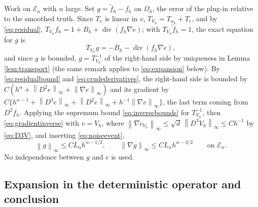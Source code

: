 \documentclass[12pt]{article}
\numberwithin{equation}{section}
\newcommand{\norm}[1]{\left\|#1\right\|}
\newcommand{\diver}{\operatorname{div}}
\begin{document}
Work on $\mathcal E_n$ with $n$ large. Set $g=\widetilde f_h-f_h$ on
$\Omega_h$, the error of the plug-in relative to the smoothed truth.
Since $T_v$ is linear in $v$, $T_{V_h}=T_{u_h}+T_e$, and by
\eqref{eq:residual},
$T_{V_h}f_h=1+B_h+\diver(f_h\nabla e)$; with $T_{V_h}\widetilde f_h=1$,
the exact equation for $g$ is
\begin{equation}\label{eq:gequation}
 T_{V_h}g=-B_h-\diver(f_h\nabla e),
\end{equation}
and since $g$ is bounded, $g=T_{V_h}^{-1}$ of the right-hand side by
uniqueness in Lemma \ref{lem:transport} (the same remark applies to
\eqref{eq:expansion} below). By \eqref{eq:residualbound} and
\eqref{eq:crudederivatives}, the right-hand side is bounded by
$C(h^\alpha+\norm{D^2e}_\infty+\norm{\nabla e}_\infty)$ and its
gradient by
$C\{h^{\alpha-1}+\norm{D^3e}_\infty+\norm{D^2e}_\infty
+h^{-1}\norm{\nabla e}_\infty\}$, the last term coming from $D^2f_h$.
Applying the supremum bound \eqref{eq:inversebounds} for
$T_{V_h}^{-1}$, then \eqref{eq:gradientinverse} with $v=V_h$, where
$\norm{\nabla c_{V_h}}_\infty\le\sqrt d\,\norm{D^3V_h}_\infty\le Ch^{-1}$
by \eqref{eq:D3V}, and inserting \eqref{eq:noiseevent},
\begin{equation}\label{eq:gbounds}
 \norm g_\infty\le CL_nh^{\alpha-1/2},
 \qquad \norm{\nabla g}_\infty\le CL_nh^{\alpha-3/2}
 \qquad\text{on }\mathcal E_n .
\end{equation}
No independence between $g$ and $e$ is used.

\subsection{Expansion in the deterministic operator and conclusion}
\end{document}
